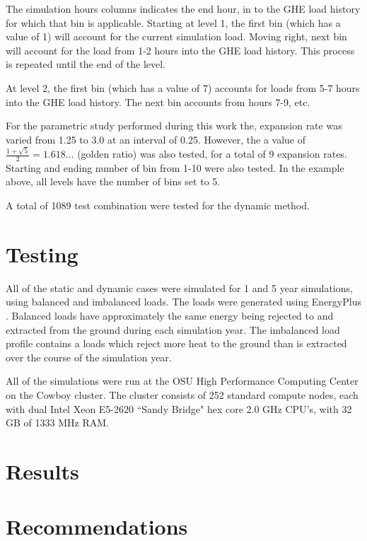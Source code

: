 \documentclass[review,12pt]{elsarticle}
\begin{document}
The simulation hours columns indicates the end hour, in to the GHE load history for which that bin is applicable. Starting at level 1, the first bin (which has a value of 1) will account for the current simulation load. Moving right, next bin will account for the load from 1-2 hours into the GHE load history. This process is repeated until the end of the level.

At level 2, the first bin (which has a value of 7) accounts for loads from 5-7 hours into the GHE load history. The next bin accounts from hours 7-9, etc.

For the parametric study performed during this work the, expansion rate was varied from 1.25 to 3.0 at an interval of 0.25. However, the a value of $\frac{1+\sqrt{5}}{2} = 1.618\ldots$ (golden ratio) was also tested, for a total of 9 expansion rates. Starting and ending number of bin from 1-10 were also tested. In the example above, all levels have the number of bins set to 5.

A total of 1089 test combination were tested for the dynamic method.

\section*{Testing}

All of the static and dynamic cases were simulated for 1 and 5 year simulations, using balanced and imbalanced loads. The loads were generated using EnergyPlus \citep{CRAWLEY2001319}. Balanced loads have approximately the same energy being rejected to and extracted from the ground during each simulation year. The imbalanced load profile contains a loads which reject more heat to the ground than is extracted over the course of the simulation year.

All of the simulations were run at the OSU High Performance Computing Center on the Cowboy cluster. The cluster consists of 252 standard compute nodes, each with dual Intel Xeon E5-2620 ``Sandy Bridge" hex core 2.0 GHz CPU's, with 32 GB of 1333 MHz RAM.

\section*{Results}



\section*{Recommendations}
\end{document}
